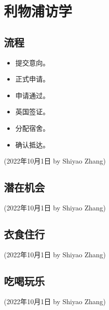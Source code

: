 \section{利物浦访学}

\subsection{流程}
\begin{itemize}
    \item 提交意向。
    \item 正式申请。
    \item 申请通过。
    \item 英国签证。
    \item 分配宿舍。
    \item 确认抵达。
\end{itemize}

\begin{flushright}
    (2022年10月1日 by Shiyao Zhang)
\end{flushright}


\subsection{潜在机会}


\begin{flushright}
    (2022年10月1日 by Shiyao Zhang)
\end{flushright}


\subsection{衣食住行}


\begin{flushright}
    (2022年10月1日 by Shiyao Zhang)
\end{flushright}


\subsection{吃喝玩乐}


\begin{flushright}
    (2022年10月1日 by Shiyao Zhang)
\end{flushright}